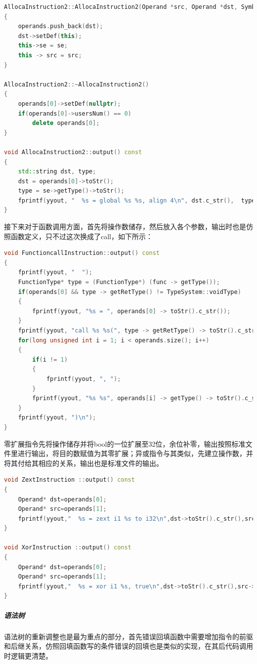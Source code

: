 \documentclass[UTF8,a4paper,10pt]{ctexart}
\begin{document}
\begin{lstlisting}[title = 全局变量输出, language = c++]
AllocaInstruction2::AllocaInstruction2(Operand *src, Operand *dst, SymbolEntry *se, BasicBlock *insert_bb) : Instruction(ALLOCA, insert_bb)
{
    operands.push_back(dst);
    dst->setDef(this);
    this->se = se;
    this -> src = src;
}

AllocaInstruction2::~AllocaInstruction2()
{
    operands[0]->setDef(nullptr);
    if(operands[0]->usersNum() == 0)
        delete operands[0];
}

void AllocaInstruction2::output() const
{
    std::string dst, type;
    dst = operands[0]->toStr();
    type = se->getType()->toStr();
    fprintf(yyout, "  %s = global %s %s, align 4\n", dst.c_str(),  type.c_str(), (src -> toStr()).c_str());
}
\end{lstlisting}

接下来对于函数调用方面，首先将操作数储存，然后放入各个参数，输出时也是仿照函数定义，只不过这次换成了call，如下所示：
\begin{lstlisting}[title = 函数调用输出, language = c++]
void FunctioncallInstruction::output() const
{
    fprintf(yyout, "  ");
    FunctionType* type = (FunctionType*) (func -> getType());
    if(operands[0] && type -> getRetType() != TypeSystem::voidType)
    {
        fprintf(yyout, "%s = ", operands[0] -> toStr().c_str());
    }
    fprintf(yyout, "call %s %s(", type -> getRetType() -> toStr().c_str(), func -> toStr().c_str());
    for(long unsigned int i = 1; i < operands.size(); i++)
    {
        if(i != 1)
        {
            fprintf(yyout, ", ");
        }
        fprintf(yyout, "%s %s", operands[i] -> getType() -> toStr().c_str(), operands[i] -> toStr().c_str());
    }
    fprintf(yyout, ")\n");
}
\end{lstlisting}

零扩展指令先将操作储存并将bool的一位扩展至32位，余位补零，输出按照标准文件里进行输出，将目的数赋值为其零扩展；异或指令与其类似，先建立操作数，并将其付给其相应的关系，输出也是标准文件的输出。
\begin{lstlisting}[title = 零扩展和异或指令, language = c++]
void ZextInstruction ::output() const
{    
    Operand* dst=operands[0];
    Operand* src=operands[1];
    fprintf(yyout,"  %s = zext i1 %s to i32\n",dst->toStr().c_str(),src->toStr().c_str() );
}

void XorInstruction ::output() const
{    
    Operand* dst=operands[0];
    Operand* src=operands[1];
    fprintf(yyout,"  %s = xor i1 %s, true\n",dst->toStr().c_str(),src->toStr().c_str() );
}
\end{lstlisting}
\subparagraph{语法树}
语法树的重新调整也是最为重点的部分，首先错误回填函数中需要增加指令的前驱和后继关系，仿照回填函数写的条件错误的回填也是类似的实现，在其后代码调用时逻辑更清楚。
\end{document}
